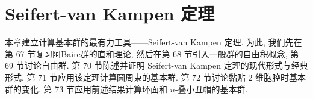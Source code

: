 \chapter{Seifert-van Kampen 定理}
\label{chapter:ch11}

本章建立计算基本群的最有力工具——Seifert-van Kampen 定理. 为此, 我们先在第 67 节复习阿Baire群的直和理论, 然后在第 68 节引入一般群的自由积概念, 第 69 节讨论自由群. 第 70 节陈述并证明 Seifert-van Kampen 定理的现代形式与经典形式. 第 71 节应用该定理计算圆周束的基本群. 第 72 节讨论黏贴 2 维胞腔时基本群的变化. 第 73 节应用前述结果计算环面和 $n$-叠小丑帽的基本群.







